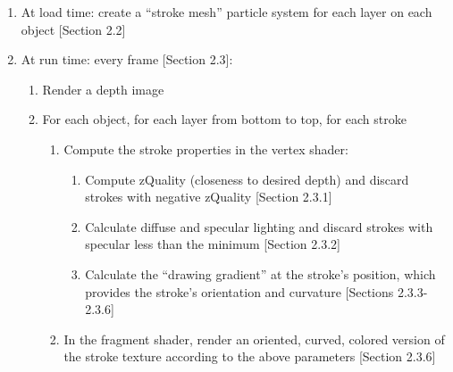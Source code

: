 \documentclass[conference]{acmsiggraph}
\begin{document}



\begin{enumerate}
  \item At load time: create a ``stroke mesh'' particle system for each layer
    on each object {[}Section 2.2{]}

  \item At run time: every frame {[}Section 2.3{]}:

      \begin{enumerate}
        \item Render a depth image
        \item For each object, for each layer from bottom to top, for each
          stroke

          \begin{enumerate}
            \item Compute the stroke properties in the vertex shader:

              \begin{enumerate}
                \item Compute zQuality (closeness to desired depth) and discard
                  strokes with negative zQuality {[}Section 2.3.1{]}
                \item Calculate diffuse and specular lighting and discard
                  strokes with specular less than the minimum
                  {[}Section 2.3.2{]}
                \item Calculate the ``drawing gradient'' at the stroke's
                  position, which provides the stroke's orientation and
                  curvature {[}Sections 2.3.3-2.3.6{]}
              \end{enumerate}

            \item In the fragment shader, render an oriented, curved, colored
              version of the stroke texture according to the above parameters
              {[}Section 2.3.6{]}

          \end{enumerate}

      \end{enumerate}

\end{enumerate}
\end{document}
